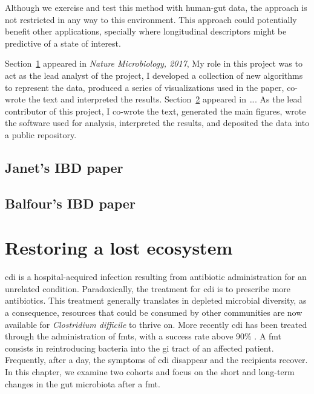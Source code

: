 \documentclass[12pt,chapterheads]{ucsd}
\begin{document}
Although we exercise and test this method with human-gut data, the approach is 
not restricted in any way to this environment. This approach could potentially 
benefit other applications, specially where longitudinal descriptors might be 
predictive of a state of interest.

Section~\ref{plane} appeared in \textsl{Nature Microbiology, 2017}, My role in 
this project was to act as the lead analyst of the project, I developed a 
collection of new algorithms to represent the data, produced a series of 
visualizations used in the paper, co-wrote the text and interpreted the 
results. Section~\ref{ibd} appeared in \dots. As the lead contributor of this 
project, I co-wrote the text, generated the main figures, wrote the software 
used for analysis, interpreted the results, and deposited the data into a 
public repository.

\ifdefined\RELEASE
    
    
\else
    \section{Janet's IBD paper}\label{plane}
    \section{Balfour's IBD paper}\label{ibd}
\fi

\chapter{Restoring a lost ecosystem}\label{chapter_fmts}
\glsresetall

\gls{cdi} is a hospital-acquired infection resulting from antibiotic 
administration for an unrelated condition. Paradoxically, the treatment for 
\gls{cdi} is to prescribe more antibiotics. This treatment generally translates 
in depleted microbial diversity, as a consequence, resources that could be 
consumed by other communities are now available for \textit{Clostridium 
difficile} to thrive on.  More recently \gls{cdi} has been treated through the 
administration of \glspl{fmt}, with a success rate above 90\% \cite{RN4129}. A 
\gls{fmt} consists in reintroducing bacteria into the \gls{gi} tract of an 
affected patient. Frequently, after a day, the symptoms of \gls{cdi} disappear 
and the recipients recover. In this chapter, we examine two cohorts and focus 
on the short and long-term changes in the gut microbiota after a \gls{fmt}.
\end{document}
